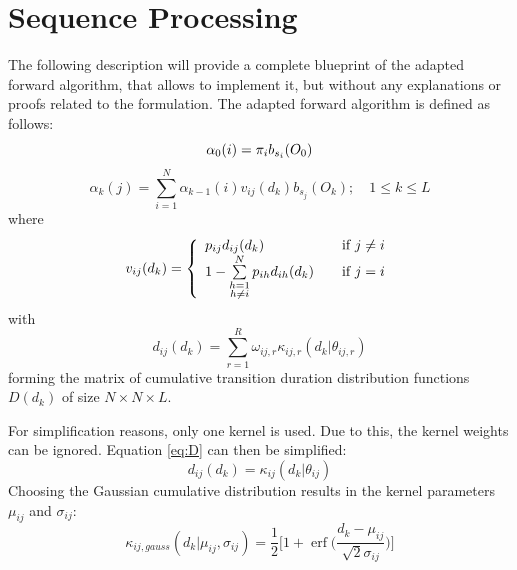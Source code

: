 \documentclass[mscthesis]{usiinfthesis}
\DeclareMathOperator{\erf}{erf}
\begin{document}
\section{Sequence Processing}
\label{ch:event_sequ}

The following description will provide a complete blueprint of the adapted
forward algorithm, that allows to implement it, but without any explanations or
proofs related to the formulation. The adapted forward algorithm is defined as
follows:
\begin{equation}
    \label{eq:forward_init}
    \alpha_0(i) = \pi_{i}b_{s_i}(O_0) \\
\end{equation}
\begin{equation}
    \label{eq:forward}
    \alpha_k(j) = \sum_{i=1}^{N} \alpha_{k-1}(i) v_{ij}(d_k) b_{s_j}(O_k);
    \quad 1 \leq k \leq L
\end{equation}
where
\begin{equation}
    \label{eq:V}
    v_{ij}(d_k) = \left\{
        \begin{array}{l l}
            p_{ij} d_{ij}(d_k)
                & \quad \text{if $j \neq i$}\\
            1 - \sum\limits_{\substack{h=1 \\ h \neq i}}^{N} p_{ih} d_{ih}(d_k)
                & \quad \text{if $j = i$}
        \end{array} \right.
\end{equation}
with
\begin{equation}
    \label{eq:D}
    d_{ij}(d_k) = \sum_{r=1}^{R} \omega_{ij,r}\kappa_{ij,r}(d_k|\theta_{ij, r})
\end{equation}
forming the matrix of cumulative transition duration distribution functions
$ D(d_k) $ of size $ N \times N \times L $.

For simplification reasons, only one kernel is used. Due to this, the kernel
weights can be ignored. Equation \ref{eq:D} can then be simplified:
\begin{equation}
    \label{eq:D_fact}
    d_{ij}(d_k) = \kappa_{ij}(d_k | \theta_{ij})
\end{equation}
Choosing the Gaussian cumulative distribution results in the kernel parameters
$ \mu_{ij} $ and $ \sigma_{ij} $:
\begin{equation}
    \label{eq:kernel}
    \kappa_{ij, gauss}(d_k | \mu_{ij}, \sigma_{ij}) = 
    \frac{1}{2}\bigg [1 + \erf \big (\frac{d_k - \mu_{ij}}{\sqrt 2 \sigma_{ij}}\big )
        \bigg ]
\end{equation}
\end{document}
